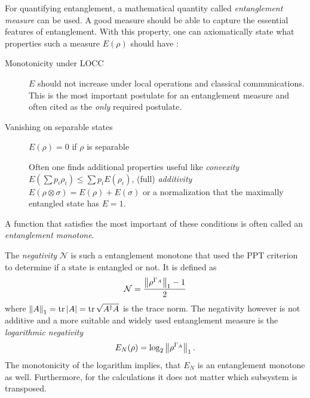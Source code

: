 For quantifying entanglement, a mathematical quantity called \emph{entanglement measure} can be used. A good measure should be able to capture the essential features of entanglement. With this property, one can axiomatically state what properties such a measure $E(\rho)$ should have \cite{Plenio_2005a,Horodecki_2009}:
\begin{description}
  \item[Monotonicity under LOCC] $E$ should not increase under local operations and classical communications. This is the most important postulate for an entanglement measure and often cited as the \textit{only} required postulate.
  \item[Vanishing on separable states] $E(\rho)=0$ if $\rho$ is separable
  \item[] Often one finds additional properties useful like \textit{convexity} $E(\sum p_i \rho_i) \leq \sum p_i E(\rho_i)$, (full) \textit{additivity} $E(\rho \otimes \sigma) = E(\rho) + E(\sigma)$ or a normalization that the maximally entangled state has $E=1$.
\end{description}
A function that satisfies the most important of these conditions is often called an \textit{entanglement monotone}.

The \emph{negativity} $\mathcal{N}$ is such a entanglement monotone \cite{Plenio_2005a} that used the PPT criterion to determine if a state is entangled or not. It is defined as 
\begin{equation}\label{eq:2:negativity}
  \mathcal{N} = \frac{\left\lVert\rho^{\Gamma_A}\right\rVert_1 - 1}{2}
\end{equation}
where $\left\lVert A\right\rVert_1 = \tr\left\lvert A\right\rvert = \tr \sqrt{A^\dagger A}$ is the trace norm. The negativity however is not additive and a more suitable and widely used entanglement measure is the \emph{logarithmic negativity} \cite{Plenio_2005,Horodecki_2009,Plenio_2005a}
\begin{equation}\label{eq:2:logarithmic-negativity}
  E_N(\rho) = \log_2\left\lVert\rho^{\Gamma_A}\right\rVert_1 .
\end{equation}
The monotonicity of the logarithm implies, that $E_N$ is an entanglement monotone as well.
Furthermore, for the calculations it does not matter which subsystem is transposed.

